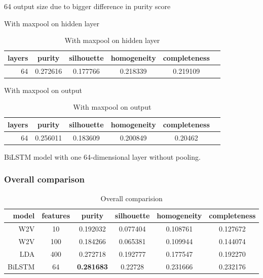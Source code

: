 \documentclass[11pt]{article}
\begin{document}
64 output size due to bigger difference in purity score

With maxpool on hidden layer

\begin{table}[htb]
\begin{center}
\begin{tabular}{ |r|c|c|c|c|c| }
\hline
layers & purity  & silhouette  & homogeneity  & completeness \\ \hline 
64 &	0.272616 	& 0.177766 	& 0.218339 	& 0.219109 \\ \hline
\end{tabular}
\end{center}
\caption{With maxpool on hidden layer}
\end{table}
\FloatBarrier

With maxpool on output

\begin{table}[htb]
\begin{center}
\begin{tabular}{ |r|c|c|c|c|c| }
\hline
layers & purity  & silhouette  & homogeneity  & completeness \\ \hline 
64 	& 0.256011 	& 0.183609 	& 0.200849 	& 0.20462 \\ \hline
\end{tabular}
\end{center}
\caption{With maxpool on output}
\end{table}
\FloatBarrier

BiLSTM model with one 64-dimensional layer without pooling.

\subsubsection{Overall comparison}

\begin{table}[htb]
\begin{center}
\begin{tabular}{ |r|c|c|c|c|c| }
\hline
model & features & purity  & silhouette  & homogeneity  & completeness \\ \hline 
W2V 	& 10   & 0.192032  & 0.077404  & 0.108761  & 0.127672 \\ \hline 
W2V 	& 100  & 0.184266  & 0.065381  & 0.109944  & 0.144074 \\ \hline 
LDA 	& 400  & 0.272718  & 0.192777  & 0.177547  & 0.192270 \\ \hline 
BiLSTM 	& 64  & \textbf{0.281683}  & 0.22728  & 0.231666  & 0.232176\\ \hline 
\end{tabular}
\end{center}
\caption{Overall comparision}
\end{table}
\FloatBarrier
\end{document}
